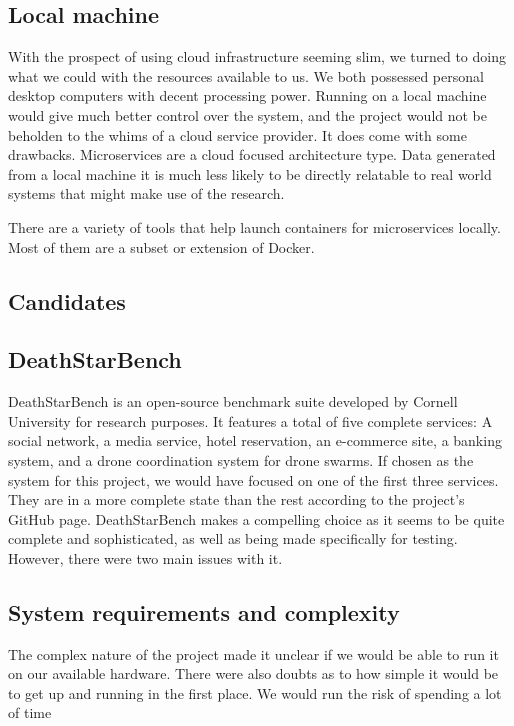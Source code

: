 \subsection{Local machine}
With the prospect of using cloud infrastructure seeming slim, we turned to doing what we could with the resources available to us. We both possessed personal desktop computers with decent processing power. 
Running on a local machine would give much better control over the system, and the project would not be beholden to the whims of a cloud service provider. 
It does come with some drawbacks. Microservices are a cloud focused architecture type. Data generated from a local machine it is much less likely to be directly relatable to real world systems that might make use of the research.

There are a variety of tools that help launch containers for microservices locally. Most of them are a subset or extension of Docker. 

\subsection{Candidates}
\subsection*{DeathStarBench}
DeathStarBench is an open-source benchmark suite developed by Cornell University for research purposes. 
It features a total of five complete services: A social network, a media service, hotel reservation, an e-commerce site, a banking system, and a drone coordination system for drone swarms. If chosen as the system for this project, we would have focused on one of the first three services. They are in a more complete state than the rest according to the project's GitHub page. 
DeathStarBench makes a compelling choice as it seems to be quite complete and sophisticated, as well as being made specifically for testing. \\
However, there were two main issues with it.
\subsection*{System requirements and complexity}
The complex nature of the project made it unclear if we would be able to run it on our available hardware. There were also doubts as to how simple it would be to get up and running in the first place. We would run the risk of spending a lot of time 